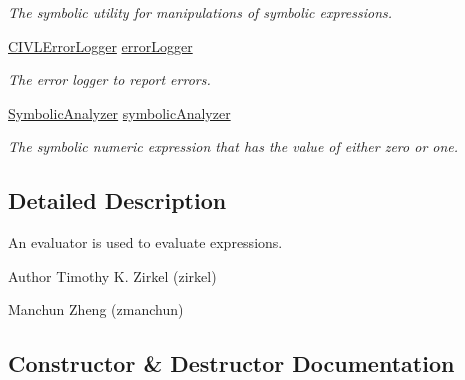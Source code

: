 \begin{DoxyCompactItemize}
\begin{DoxyCompactList}\small\item\em The symbolic utility for manipulations of symbolic expressions. \end{DoxyCompactList}\item 
\hypertarget{classedu_1_1udel_1_1cis_1_1vsl_1_1civl_1_1semantics_1_1common_1_1CommonEvaluator_a01fcde97a26da8cc29f2dd594e138cde}{}\hyperlink{classedu_1_1udel_1_1cis_1_1vsl_1_1civl_1_1log_1_1IF_1_1CIVLErrorLogger}{C\+I\+V\+L\+Error\+Logger} \hyperlink{classedu_1_1udel_1_1cis_1_1vsl_1_1civl_1_1semantics_1_1common_1_1CommonEvaluator_a01fcde97a26da8cc29f2dd594e138cde}{error\+Logger}\label{classedu_1_1udel_1_1cis_1_1vsl_1_1civl_1_1semantics_1_1common_1_1CommonEvaluator_a01fcde97a26da8cc29f2dd594e138cde}

\begin{DoxyCompactList}\small\item\em The error logger to report errors. \end{DoxyCompactList}\item 
\hyperlink{interfaceedu_1_1udel_1_1cis_1_1vsl_1_1civl_1_1semantics_1_1IF_1_1SymbolicAnalyzer}{Symbolic\+Analyzer} \hyperlink{classedu_1_1udel_1_1cis_1_1vsl_1_1civl_1_1semantics_1_1common_1_1CommonEvaluator_a714f874cf229bac7bf45da9f359c141e}{symbolic\+Analyzer}
\begin{DoxyCompactList}\small\item\em The symbolic numeric expression that has the value of either zero or one. \end{DoxyCompactList}\end{DoxyCompactItemize}


\subsection{Detailed Description}
An evaluator is used to evaluate expressions. 

\begin{DoxyAuthor}{Author}
Timothy K. Zirkel (zirkel) 

Manchun Zheng (zmanchun) 
\end{DoxyAuthor}


\subsection{Constructor \& Destructor Documentation}
\hypertarget{classedu_1_1udel_1_1cis_1_1vsl_1_1civl_1_1semantics_1_1common_1_1CommonEvaluator_a8746c4deea2a861efa0f60966058858b}{}
